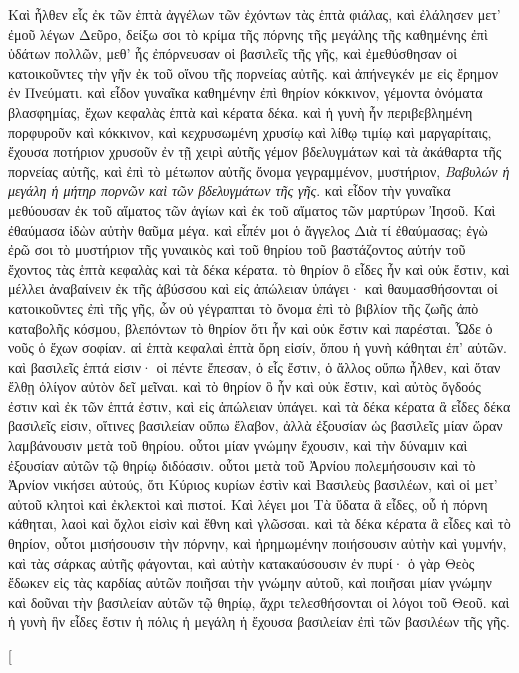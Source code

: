 \begin{pages}
    \begin{Rightside}
        \beginnumbering
		Καὶ ἦλθεν εἷς ἐκ τῶν ἑπτὰ ἀγγέλων τῶν ἐχόντων τὰς ἑπτὰ φιάλας, καὶ ἐλάλησεν μετ’ ἐμοῦ λέγων Δεῦρο, δείξω σοι τὸ κρίμα τῆς πόρνης τῆς μεγάλης τῆς καθημένης ἐπὶ ὑδάτων πολλῶν, μεθ’ ἧς ἐπόρνευσαν οἱ βασιλεῖς τῆς γῆς, καὶ ἐμεθύσθησαν οἱ κατοικοῦντες τὴν γῆν ἐκ τοῦ οἴνου τῆς πορνείας αὐτῆς. 
		\pend
		\pstart
		καὶ ἀπήνεγκέν με εἰς ἔρημον ἐν Πνεύματι. καὶ εἶδον γυναῖκα καθημένην ἐπὶ θηρίον κόκκινον, γέμοντα ὀνόματα βλασφημίας, ἔχων κεφαλὰς ἑπτὰ καὶ κέρατα δέκα. καὶ ἡ γυνὴ ἦν περιβεβλημένη πορφυροῦν καὶ κόκκινον, καὶ κεχρυσωμένη χρυσίῳ καὶ λίθῳ τιμίῳ καὶ μαργαρίταις, ἔχουσα ποτήριον χρυσοῦν ἐν τῇ χειρὶ αὐτῆς γέμον βδελυγμάτων καὶ τὰ ἀκάθαρτα τῆς πορνείας αὐτῆς, καὶ ἐπὶ τὸ μέτωπον αὐτῆς ὄνομα γεγραμμένον, μυστήριον, \textit{Βαβυλών  ἡ μεγάλη ἡ μήτηρ πορνῶν καὶ τῶν βδελυγμάτων τῆς γῆς}.
		\pend
		\pstart
		καὶ εἶδον τὴν γυναῖκα μεθύουσαν ἐκ τοῦ αἵματος τῶν ἁγίων καὶ ἐκ τοῦ αἵματος τῶν μαρτύρων Ἰησοῦ. Καὶ ἐθαύμασα ἰδὼν αὐτὴν θαῦμα μέγα. καὶ εἶπέν μοι ὁ ἄγγελος Διὰ τί ἐθαύμασας; ἐγὼ ἐρῶ σοι τὸ μυστήριον τῆς γυναικὸς καὶ τοῦ θηρίου τοῦ βαστάζοντος αὐτήν τοῦ ἔχοντος τὰς ἑπτὰ κεφαλὰς καὶ τὰ δέκα κέρατα. τὸ θηρίον ὃ εἶδες ἦν καὶ οὐκ ἔστιν, καὶ μέλλει ἀναβαίνειν ἐκ τῆς ἀβύσσου καὶ εἰς ἀπώλειαν ὑπάγει· καὶ θαυμασθήσονται οἱ κατοικοῦντες ἐπὶ τῆς γῆς, ὧν οὐ γέγραπται τὸ ὄνομα ἐπὶ τὸ βιβλίον τῆς ζωῆς ἀπὸ καταβολῆς κόσμου, βλεπόντων τὸ θηρίον ὅτι ἦν καὶ οὐκ ἔστιν καὶ παρέσται. 
		\pend
		\pstart
		Ὧδε ὁ νοῦς ὁ ἔχων σοφίαν. αἱ ἑπτὰ κεφαλαὶ ἑπτὰ ὄρη εἰσίν, ὅπου ἡ γυνὴ κάθηται ἐπ’ αὐτῶν. καὶ βασιλεῖς ἑπτά εἰσιν· οἱ πέντε ἔπεσαν, ὁ εἷς ἔστιν, ὁ ἄλλος οὔπω ἦλθεν, καὶ ὅταν ἔλθῃ ὀλίγον αὐτὸν δεῖ μεῖναι.
		\pend 
		\pstart
		καὶ τὸ θηρίον ὃ ἦν καὶ οὐκ ἔστιν, καὶ αὐτὸς ὄγδοός ἐστιν καὶ ἐκ τῶν ἑπτά ἐστιν, καὶ εἰς ἀπώλειαν ὑπάγει. καὶ τὰ δέκα κέρατα ἃ εἶδες δέκα βασιλεῖς εἰσιν, οἵτινες βασιλείαν οὔπω ἔλαβον, ἀλλὰ ἐξουσίαν ὡς βασιλεῖς μίαν ὥραν λαμβάνουσιν μετὰ τοῦ θηρίου. οὗτοι μίαν γνώμην ἔχουσιν, καὶ τὴν δύναμιν καὶ ἐξουσίαν αὐτῶν τῷ θηρίῳ διδόασιν. οὗτοι μετὰ τοῦ Ἀρνίου πολεμήσουσιν καὶ τὸ Ἀρνίον νικήσει αὐτούς, ὅτι Κύριος κυρίων ἐστὶν καὶ Βασιλεὺς βασιλέων, καὶ οἱ μετ’ αὐτοῦ κλητοὶ καὶ ἐκλεκτοὶ καὶ πιστοί.
		\pend
		\pstart
		Καὶ λέγει μοι Τὰ ὕδατα ἃ εἶδες, οὗ ἡ πόρνη κάθηται, λαοὶ καὶ ὄχλοι εἰσὶν καὶ ἔθνη καὶ γλῶσσαι. καὶ τὰ δέκα κέρατα ἃ εἶδες καὶ τὸ θηρίον, οὗτοι μισήσουσιν τὴν πόρνην, καὶ ἠρημωμένην ποιήσουσιν αὐτὴν καὶ γυμνήν, καὶ τὰς σάρκας αὐτῆς φάγονται, καὶ αὐτὴν κατακαύσουσιν ἐν πυρί· ὁ γὰρ Θεὸς ἔδωκεν εἰς τὰς καρδίας αὐτῶν ποιῆσαι τὴν γνώμην αὐτοῦ, καὶ ποιῆσαι μίαν γνώμην καὶ δοῦναι τὴν βασιλείαν αὐτῶν τῷ θηρίῳ, ἄχρι τελεσθήσονται οἱ λόγοι τοῦ Θεοῦ. καὶ ἡ γυνὴ ἣν εἶδες ἔστιν ἡ πόλις ἡ μεγάλη ἡ ἔχουσα βασιλείαν ἐπὶ τῶν βασιλέων τῆς γῆς.
		\pend
        \endnumbering
    \end{Rightside}
    \begin{Leftside}
        \beginnumbering
        \pstart[

\end{Leftside}
\end{pages}
